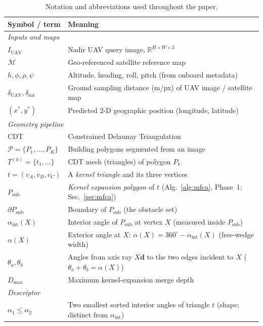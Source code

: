 \documentclass[10pt]{article}
\theoremstyle{plain}
\theoremstyle{definition}
\begin{document}
\begin{table}[htbp]
\caption{Notation and abbreviations used throughout the paper.}
\label{tab:notation}
\centering\small
\setlength{\tabcolsep}{5pt}
\begin{tabular}{@{}l@{\hspace{10pt}}>{\raggedright\arraybackslash}p{10.2cm}@{}}
\toprule
\textbf{Symbol / term} & \textbf{Meaning} \\
\midrule
\multicolumn{2}{l}{\textit{Inputs and maps}}\\
$I_{\mathrm{UAV}}$ & Nadir UAV query image, $\mathbb{R}^{H\times W\times 3}$ \\
$\mathcal{M}$ & Geo-referenced satellite reference map \\
$h,\phi,\rho,\psi$ & Altitude, heading, roll, pitch (from onboard metadata) \\
$\delta_{\mathrm{UAV}},\delta_{\mathrm{sat}}$ & Ground sampling distance (m/px) of UAV image / satellite map \\
$(x^*,y^*)$ & Predicted 2-D geographic position (longitude, latitude) \\
\midrule
\multicolumn{2}{l}{\textit{Geometry pipeline}}\\
CDT & Constrained Delaunay Triangulation \\
$\mathcal{P}=\{P_1,\dots,P_K\}$ & Building polygons segmented from an image \\
$T^{(k)}=\{t_1,\dots\}$ & CDT mesh (triangles) of polygon $P_k$ \\
$t=(v_A,v_B,v_C)$ & A \emph{kernel triangle} and its three vertices \\
$P_{\mathrm{sub}}$ & \emph{Kernel expansion polygon} of $t$ (Alg.~\ref{alg:mfca}, Phase~1; Sec.~\ref{sec:mfca}) \\
$\partial P_{\mathrm{sub}}$ & Boundary of $P_{\mathrm{sub}}$ (the obstacle set) \\
$\alpha_{\mathrm{int}}(X)$ & Interior angle of $P_{\mathrm{sub}}$ at vertex $X$ (measured inside $P_{\mathrm{sub}}$) \\
$\alpha(X)$ & Exterior angle at $X$: $\alpha(X)=360^\circ-\alpha_{\mathrm{int}}(X)$ (free-wedge width) \\
$\theta_a,\theta_b$ & Angles from axis ray $X\mathbf{d}$ to the two edges incident to $X$ ($\theta_a{+}\theta_b{=}\alpha(X)$) \\
$D_{\max}$ & Maximum kernel-expansion merge depth \\
\midrule
\multicolumn{2}{l}{\textit{Descriptor}}\\
$\alpha_1\le\alpha_2$ & Two smallest sorted interior angles of triangle $t$ (shape; distinct from $\alpha_{\mathrm{int}}$) \\

\end{tabular}
\end{table}
\end{document}
